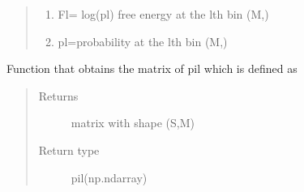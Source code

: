 \documentclass[letterpaper,10pt,english]{sphinxmanual}
\begin{document}
\begin{fulllineitems}
\begin{fulllineitems}
\begin{quote}
\begin{description}
\begin{enumerate}
\item {} 
Fl= \sphinxhyphen{}log(pl) free energy at the lth bin (M,)

\item {} 
pl=probability at the lth bin (M,)

\end{enumerate}


\end{description}\end{quote}

\end{fulllineitems}


\begin{fulllineitems}
\label{\detokenize{wham:wham.Bwham.Bwham.get_pil}}
Function that obtains the matrix of pil which is defined as
\begin{quote}\begin{description}
\item[{Returns}] \leavevmode
matrix with shape (S,M)

\item[{Return type}] \leavevmode
pil(np.ndarray)

\end{description}\end{quote}

\end{fulllineitems}


\end{fulllineitems}

\end{document}
